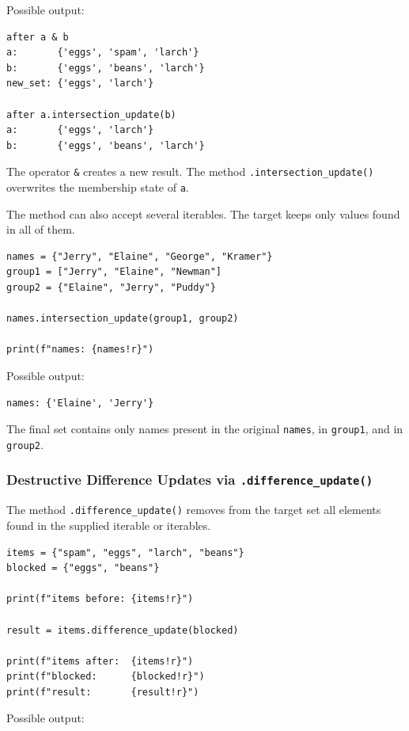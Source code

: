 Possible output:

\begin{verbatim}
after a & b
a:       {'eggs', 'spam', 'larch'}
b:       {'eggs', 'beans', 'larch'}
new_set: {'eggs', 'larch'}

after a.intersection_update(b)
a:       {'eggs', 'larch'}
b:       {'eggs', 'beans', 'larch'}
\end{verbatim}

The operator \texttt{\&} creates a new result. The method \texttt{.intersection\_update()} overwrites the membership state of \texttt{a}.

The method can also accept several iterables. The target keeps only values found in all of them.

\begin{verbatim}
names = {"Jerry", "Elaine", "George", "Kramer"}
group1 = ["Jerry", "Elaine", "Newman"]
group2 = {"Elaine", "Jerry", "Puddy"}

names.intersection_update(group1, group2)

print(f"names: {names!r}")
\end{verbatim}

Possible output:

\begin{verbatim}
names: {'Elaine', 'Jerry'}
\end{verbatim}

The final set contains only names present in the original \texttt{names}, in \texttt{group1}, and in \texttt{group2}.

\subsubsection{Destructive Difference Updates via \texttt{.difference\_update()}}

The method \texttt{.difference\_update()} removes from the target set all elements found in the supplied iterable or iterables.

\begin{verbatim}
items = {"spam", "eggs", "larch", "beans"}
blocked = {"eggs", "beans"}

print(f"items before: {items!r}")

result = items.difference_update(blocked)

print(f"items after:  {items!r}")
print(f"blocked:      {blocked!r}")
print(f"result:       {result!r}")
\end{verbatim}

Possible output:

